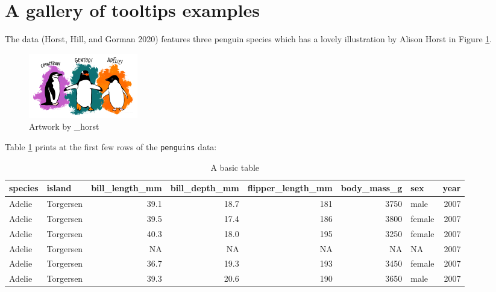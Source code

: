 \hypertarget{a-gallery-of-tooltips-examples}{%
\section{A gallery of tooltips examples}\label{a-gallery-of-tooltips-examples}}

The  data (Horst, Hill, and Gorman 2020) features three penguin species which has a lovely illustration by Alison Horst in Figure \ref{fig:penguins-alison}.

\begin{figure}
\includegraphics[width=1\linewidth,height=0.3\textheight]{penguins} \caption{Artwork by \@allison\_horst}\label{fig:penguins-alison}
\end{figure}

Table \ref{tab:penguins-tab-static} prints at the first few rows of the \texttt{penguins} data:

\begin{table}

\caption{\label{tab:penguins-tab-static}A basic table}
\centering
\fontsize{7}{9}\selectfont
\begin{tabular}[t]{l|l|r|r|r|r|l|r}
\hline
species & island & bill\_length\_mm & bill\_depth\_mm & flipper\_length\_mm & body\_mass\_g & sex & year\\
\hline
Adelie & Torgersen & 39.1 & 18.7 & 181 & 3750 & male & 2007\\
\hline
Adelie & Torgersen & 39.5 & 17.4 & 186 & 3800 & female & 2007\\
\hline
Adelie & Torgersen & 40.3 & 18.0 & 195 & 3250 & female & 2007\\
\hline
Adelie & Torgersen & NA & NA & NA & NA & NA & 2007\\
\hline
Adelie & Torgersen & 36.7 & 19.3 & 193 & 3450 & female & 2007\\
\hline
Adelie & Torgersen & 39.3 & 20.6 & 190 & 3650 & male & 2007\\
\hline
\end{tabular}
\end{table}

